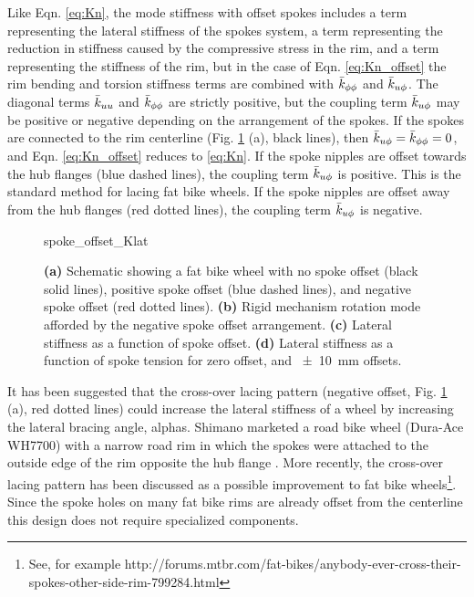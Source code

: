\documentclass[\rootdir/thesis.tex]{subfiles}
\begin{document}
Like Eqn. \eqref{eq:Kn}, the mode stiffness with offset spokes includes a term representing the lateral stiffness of the spokes system, a term representing the reduction in stiffness caused by the compressive stress in the rim, and a term representing the stiffness of the rim, but in the case of Eqn. \eqref{eq:Kn_offset} the rim bending and torsion stiffness terms are combined with $\bar{k}_{\phi\phi}$ and $\bar{k}_{u\phi}$. The diagonal terms $\bar{k}_{uu}$ and $\bar{k}_{\phi\phi}$ are strictly positive, but the coupling term $\bar{k}_{u\phi}$ may be positive or negative depending on the arrangement of the spokes. If the spokes are connected to the rim centerline (Fig. \ref{fig:spoke_offset} (a), black lines), then $\bar{k}_{u\phi}=\bar{k}_{\phi\phi}=0$, and Eqn. \eqref{eq:Kn_offset} reduces to \eqref{eq:Kn}. If the spoke nipples are offset towards the hub flanges (blue dashed lines), the coupling term $\bar{k}_{u\phi}$ is positive. This is the standard method for lacing fat bike wheels. If the spoke nipples are offset away from the hub flanges (red dotted lines), the coupling term $\bar{k}_{u\phi}$ is negative.

\begin{figure}[t]
\centering
{spoke_offset_Klat}
\caption[Lateral stiffness with laterally-offset spokes]{\textbf{(a)} Schematic showing a fat bike wheel with no spoke offset (black solid lines), positive spoke offset (blue dashed lines), and negative spoke offset (red dotted lines). \textbf{(b)} Rigid mechanism rotation mode afforded by the negative spoke offset arrangement. \textbf{(c)} Lateral stiffness as a function of spoke offset. \textbf{(d)} Lateral stiffness as a function of spoke tension for zero offset, and \SI{+-10}{mm} offsets.}
\label{fig:spoke_offset}
\end{figure}

It has been suggested that the cross-over lacing pattern (negative offset, Fig. \ref{fig:spoke_offset} (a), red dotted lines) could increase the lateral stiffness of a wheel by increasing the lateral bracing angle, \gls{alphas}. Shimano marketed a road bike wheel (Dura-Ace WH7700) with a narrow road rim in which the spokes were attached to the outside edge of the rim opposite the hub flange \cite{Rinard}. More recently, the cross-over lacing pattern has been discussed as a possible improvement to fat bike wheels\footnote{See, for example http://forums.mtbr.com/fat-bikes/anybody-ever-cross-their-spokes-other-side-rim-799284.html}. Since the spoke holes on many fat bike rims are already offset from the centerline this design does not require specialized components.
\end{document}
